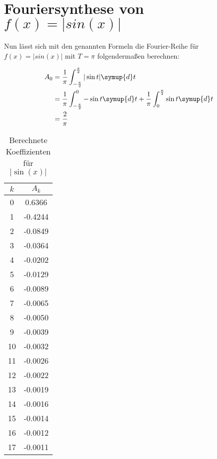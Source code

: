 \section{Fouriersynthese von $f(x)=|sin(x)|$}

Nun lässt sich mit den genannten Formeln die Fourier-Reihe für $f(x)=|sin(x)|$ mit $T=\pi$ folgendermaßen berechnen:

\begin{align}
    A_0 &= \frac{1}{\pi} \int_{-\frac{\pi}{2}}^{\frac{\pi}{2}} | \sin t | \symup{d}t \\
    &= \frac{1}{\pi} \int_{-\frac{\pi}{2}}^0 -\sin t \symup{d}t + \frac{1}{\pi} \int_0^{\frac{\pi}{2}} \sin t \symup{d}t \\
    &= \frac{2}{\pi}
\end{align}

\begin{table}
  \centering
  \caption{Berechnete Koeffizienten für $|\sin(x)|$}
  \label{tab:a_sin}
  \begin{tabular}{c c}
    \toprule 
    $k$ & $A_k$ \\ 
    \midrule 
    0 & 0.6366 \\
    1 & -0.4244 \\
    2 & -0.0849 \\
    3 & -0.0364 \\
    4 & -0.0202 \\
    5 & -0.0129 \\
    6 & -0.0089 \\
    7 & -0.0065 \\
    8 & -0.0050 \\
    9 & -0.0039 \\
    10 & -0.0032 \\
    11 & -0.0026 \\
    12 & -0.0022 \\
    13 & -0.0019 \\
    14 & -0.0016 \\
    15 & -0.0014 \\
    16 & -0.0012 \\
    17 & -0.0011 \\ 
    \bottomrule
  \end{tabular}
\end{table}
